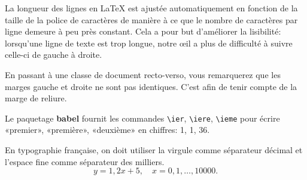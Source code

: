 \documentclass[10pt]{article}
\begin{document}
La longueur des lignes en {\LaTeX} est ajustée automatiquement en
fonction de la taille de la police de caractères de manière à ce que le
nombre de caractères par ligne demeure à peu près constant. Cela a
pour but d'améliorer la lisibilité: lorsqu'une ligne de texte est trop
longue, notre œil a plus de difficulté à suivre celle-ci de gauche à
droite.

En passant à une classe de document recto-verso, vous remarquerez que
les marges gauche et droite ne sont pas identiques. C'est afin de
tenir compte de la marge de reliure.

Le paquetage \textbf{babel} fournit les commandes \verb=\ier=,
\verb=\iere=, \verb=\ieme= pour écrire «premier», «première»,
«deuxième» en chiffres: 1{\ier}, 1{\iere}, 36{\ieme}.

En typographie française, on doit utiliser la virgule comme séparateur
décimal et l'espace fine comme séparateur des milliers.
\begin{displaymath}
  y = 1,2x + 5, \quad x = 0, 1, \dots, 10 000.
\end{displaymath}
\end{document}
